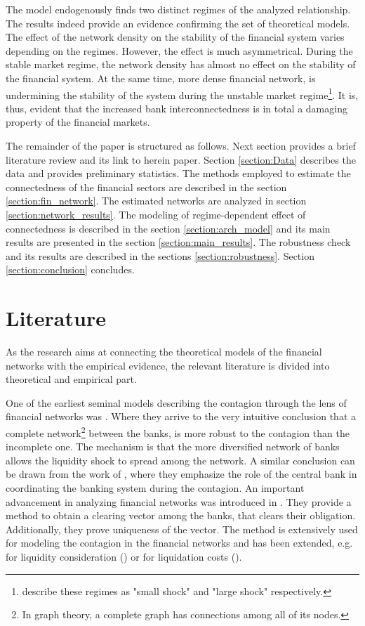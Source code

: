 \documentclass[12pt]{article}
\begin{document}
The model endogenously finds two distinct regimes of the analyzed relationship. The results indeed provide an evidence confirming the set of theoretical models. The effect of the network density on the stability of the financial system varies depending on the regimes. However, the effect is much asymmetrical. During the stable market regime, the network density has almost no effect on the stability of the financial system. At the same time, more dense financial network, is undermining the stability of the system during the unstable market regime\footnote{\cite{acemoglu13} describe these regimes as "small shock" and "large shock" respectively.}. It is, thus, evident that the increased bank interconnectedness is in total a damaging property of the financial markets. 

The remainder of the paper is structured as follows. Next section provides a brief literature review and its link to herein paper. Section \ref{section:Data} describes the data and provides preliminary statistics. The methods employed to estimate the connectedness of the financial sectors are described in the section \ref{section:fin_network}. The estimated networks are analyzed in section \ref{section:network_results}. The modeling of regime-dependent effect of connectedness is described in the section \ref{section:arch_model} and its main results are presented in the section \ref{section:main_results}. The robustness check and its results are described in the sections \ref{section:robustness}. Section \ref{section:conclusion} concludes.

\section{Literature}\label{section:literature}

As the research aims at connecting the theoretical models of the financial networks with the empirical evidence, the relevant literature is divided into theoretical and empirical part.

One of the earliest seminal models describing the contagion through the lens of financial networks was \cite{allen00}. Where they arrive to the very intuitive conclusion that a complete network\footnote{In graph theory, a complete graph has connections among all of its nodes.} between the banks, is more robust to the contagion than the incomplete one. The mechanism is that the more diversified network of banks allows the liquidity shock to spread among the network. A similar conclusion can be drawn from the work of \cite{freixas00}, where they emphasize the role of the central bank in coordinating the banking system during the contagion. An important advancement in analyzing financial networks was introduced in \cite{eisenberg01}. They provide a method to obtain a clearing vector among the banks, that clears their obligation. Additionally, they prove uniqueness of the vector. The method is extensively used for modeling the contagion in the financial networks and has been extended, e.g. for liquidity consideration (\cite{cifuentes05}) or for liquidation costs (\cite{rogers13}). 
\end{document}
